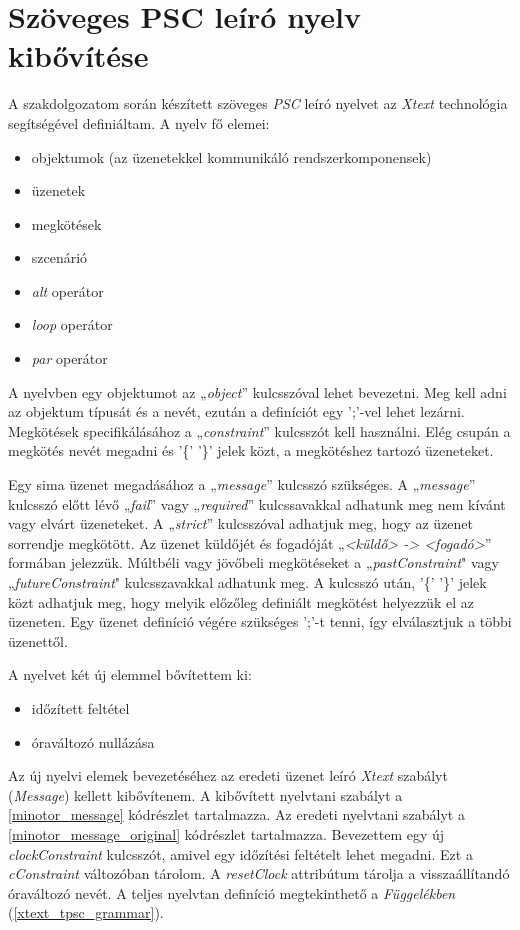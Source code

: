 \chapter{Szöveges PSC leíró nyelv kibővítése}

A szakdolgozatom során készített szöveges \textit{PSC} leíró nyelvet \cite{Bakai} az \textit{Xtext} technológia segítségével definiáltam.
A nyelv fő elemei:
\begin{itemize}
    \item objektumok (az üzenetekkel kommunikáló rendszerkomponensek)
    \item üzenetek
    \item megkötések
    \item szcenárió
    \item \textit{alt} operátor
    \item \textit{loop} operátor
    \item \textit{par} operátor
\end{itemize}

A nyelvben egy objektumot az „\textit{object}” kulcsszóval lehet bevezetni.
Meg kell adni az objektum típusát és a nevét, ezután a definíciót egy ’;’-vel lehet lezárni.
Megkötések specifikálásához a „\textit{constraint}” kulcsszót kell használni.
Elég csupán a megkötés nevét megadni és '\{' '\}' jelek közt, a megkötéshez tartozó üzeneteket.

Egy sima üzenet megadásához a „\textit{message}” kulcsszó szükséges.
A „\textit{message}” kulcsszó előtt lévő „\textit{fail}” vagy „\textit{required}” kulcssavakkal adhatunk meg nem kívánt vagy elvárt üzeneteket.
A „\textit{strict}” kulcsszóval adhatjuk meg, hogy az üzenet sorrendje megkötött.
Az üzenet küldőjét és fogadóját „\textit{<küldő> -> <fogadó>}” formában jelezzük.
Múltbéli vagy jövőbeli megkötéseket a „\textit{pastConstraint}" vagy „\textit{futureConstraint}" kulcsszavakkal adhatunk meg.
A kulcsszó után, '\{' '\}' jelek közt adhatjuk meg, hogy melyik előzőleg definiált megkötést helyezzük el az üzeneten.
Egy üzenet definíció végére szükséges ’;’-t tenni, így elválasztjuk a többi üzenettől.

A nyelvet két új elemmel bővítettem ki:
\begin{itemize}
    \item időzített feltétel
    \item óraváltozó nullázása
\end{itemize}
Az új nyelvi elemek bevezetéséhez az eredeti üzenet leíró \textit{Xtext} szabályt (\textit{Message}) kellett kibővítenem.
A kibővített nyelvtani szabályt a \ref{minotor_message} kódrészlet tartalmazza.
Az eredeti nyelvtani szabályt a \ref{minotor_message_original} kódrészlet tartalmazza.
Bevezettem egy új \textit{clockConstraint} kulcsszót, amivel egy időzítési feltételt lehet megadni.
Ezt a \textit{cConstraint} változóban tárolom.
A \textit{resetClock} attribútum tárolja a visszaállítandó óraváltozó nevét.
A teljes nyelvtan definíció megtekinthető a \textit{Függelékben} (\ref{xtext_tpsc_grammar}).

